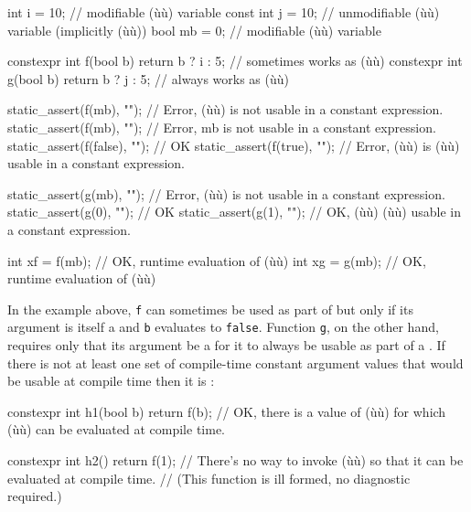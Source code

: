 \begin{emcppslisting}[emcppsbatch=e5]
      int  i = 10;  // modifiable (ù{}ù) variable
const int  j = 10;  // unmodifiable (ù{}ù) variable (implicitly (ù{}ù))
      bool mb = 0;  // modifiable (ù{}ù) variable

constexpr int f(bool b) { return b ? i : 5; }  // sometimes works as (ù{}ù)
constexpr int g(bool b) { return b ? j : 5; }  //    always works as (ù{}ù)

static_assert(f(mb),    "");  // Error, (ù{}ù) is not usable in a constant expression.
static_assert(f(mb),    "");  // Error, mb is not usable in a constant expression.
static_assert(f(false),  "");  // OK
static_assert(f(true), "");  // Error, (ù{}ù) is (ù{}ù) usable in a constant expression.

static_assert(g(mb), "");  // Error, (ù{}ù) is not usable in a constant expression.
static_assert(g(0),  "");  // OK
static_assert(g(1),  "");  // OK, (ù{}ù) (ù{}ù) usable in a constant expression.

int xf = f(mb);  // OK, runtime evaluation of (ù{}ù)
int xg = g(mb);  // OK, runtime evaluation of (ù{}ù)
\end{emcppslisting}


\noindent In the example above, \lstinline!f! can sometimes be used as part of
 but only if its argument is itself a
 and \lstinline!b! evaluates to \lstinline!false!.
Function \lstinline!g!, on the other hand, requires only that its argument
be a  for it to always be usable as part of
a . If there is not at least one set of
compile-time constant argument values that would be usable at compile
time then it is :

\begin{emcppslisting}[emcppsbatch=e5]
constexpr int h1(bool b) { return f(b); }
    // OK, there is a value of (ù{}ù) for which (ù{}ù) can be evaluated at compile time.

constexpr int h2() { return f(1); }
    // There's no way to invoke (ù{}ù) so that it can be evaluated at compile time.
    // (This function is ill formed, no diagnostic required.)
\end{emcppslisting}


